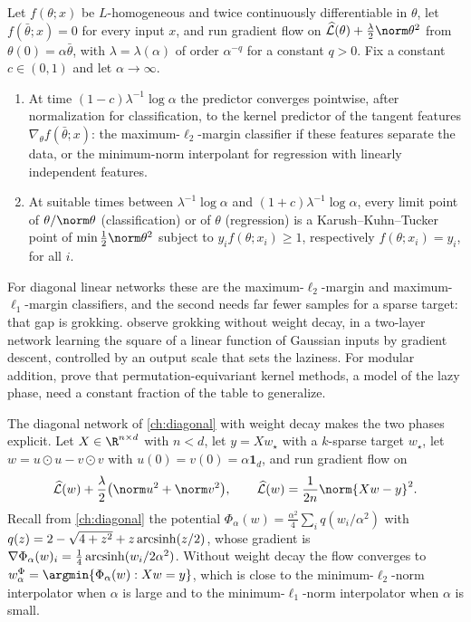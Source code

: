 \begin{refsection}
\begin{theorem}\label{thm:grokking:lyu}
Let $f(\theta;x)$ be $L$-homogeneous and twice continuously differentiable in $\theta$, let $f(\bar\theta;x)=0$ for every input $x$, and run gradient flow on $\Lhat(\theta)+\frac\lambda2\norm\theta^2$ from $\theta(0)=\alpha\bar\theta$, with $\lambda=\lambda(\alpha)$ of order $\alpha^{-q}$ for a constant $q>0$. Fix a constant $c\in(0,1)$ and let $\alpha\to\infty$.
\begin{enumerate}
\item At time $(1-c)\lambda^{-1}\log\alpha$ the predictor converges pointwise, after normalization for classification, to the kernel predictor of the tangent features $\nabla_\theta f(\bar\theta;x)$: the maximum-$\ell_2$-margin classifier if these features separate the data, or the minimum-norm interpolant for regression with linearly independent features.
\item At suitable times between $\lambda^{-1}\log\alpha$ and $(1+c)\lambda^{-1}\log\alpha$, every limit point of $\theta/\norm\theta$ (classification) or of $\theta$ (regression) is a Karush--Kuhn--Tucker point of $\min\frac12\norm\theta^2$ subject to $y_if(\theta;x_i)\ge1$, respectively $f(\theta;x_i)=y_i$, for all $i$.
\end{enumerate}
\end{theorem}

For diagonal linear networks these are the maximum-$\ell_2$-margin and maximum-$\ell_1$-margin classifiers, and the second needs far fewer samples for a sparse target: that gap is grokking. \Textcite{KumarEtAl2024} observe grokking without weight decay, in a two-layer network learning the square of a linear function of Gaussian inputs by gradient descent, controlled by an output scale that sets the laziness. For modular addition, \textcite{MohamadiEtAl2024} prove that permutation-equivariant kernel methods, a model of the lazy phase, need a constant fraction of the table to generalize.

The diagonal network of \cref{ch:diagonal} with weight decay makes the two phases explicit. Let $X\in\R^{n\times d}$ with $n<d$, let $y=Xw_\star$ with a $k$-sparse target $w_\star$, let $w=u\odot u-v\odot v$ with $u(0)=v(0)=\alpha\mathbf1_d$, and run gradient flow on
\[
  \Lhat(w)+\frac\lambda2\bigl(\norm u^2+\norm v^2\bigr),\qquad \Lhat(w)=\frac1{2n}\norm{Xw-y}^2 .
\]
Recall from \cref{ch:diagonal} the potential $\Phi_\alpha(w)=\frac{\alpha^2}4\sum_iq(w_i/\alpha^2)$ with $q(z)=2-\sqrt{4+z^2}+z\operatorname{arcsinh}(z/2)$, whose gradient is $\nabla\Phi_\alpha(w)_i=\frac14\operatorname{arcsinh}(w_i/2\alpha^2)$. Without weight decay the flow converges to $w^\Phi_\alpha=\argmin\{\Phi_\alpha(w):Xw=y\}$, which is close to the minimum-$\ell_2$-norm interpolator when $\alpha$ is large and to the minimum-$\ell_1$-norm interpolator when $\alpha$ is small.


\end{refsection}
